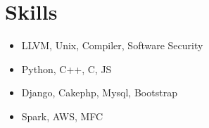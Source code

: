 \documentclass[a4paper,10pt]{article}
\begin{document}
\section{Skills}
\begin{itemize}
\item LLVM, Unix, Compiler, Software Security
\item Python, C++, C, JS
\item Django, Cakephp, Mysql, Bootstrap
\item Spark, AWS, MFC
\end{itemize}



\end{document}
